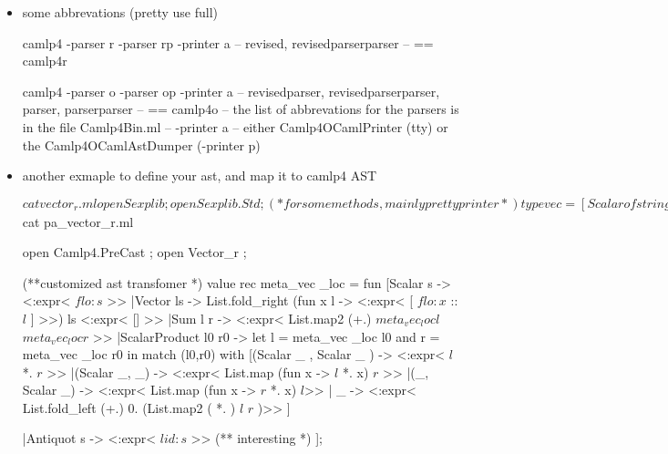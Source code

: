 \begin{itemize}
\begin{ocamlcode}
open Camlp4.PreCast ;;
module Gram = MakeGram(Lexer );;
\end{ocamlcode}


\item some abbrevations (pretty use full)


\begin{ocamlcode}
camlp4 -parser r -parser rp -printer a
--  revised, revisedparserparser
-- == camlp4r

camlp4 -parser o -parser op -printer a
-- revisedparser, revisedparserparser, parser, parserparser
-- == camlp4o
-- the list of abbrevations for the parsers is in the file Camlp4Bin.ml
-- -printer a
-- either Camlp4OCamlPrinter (tty) or the Camlp4OCamlAstDumper (-printer p)

\end{ocamlcode}


\item another exmaple to define your ast, and map it to camlp4 AST   


\begin{ocamlcode}
$cat vector_r.ml
open Sexplib ; 
open Sexplib.Std ;  (* for some methods, mainly pretty printer  *)
type vec = 
  [Scalar of string 
  |Vector of  list string 
  |Sum of vec and vec 
  |ScalarProduct of vec and vec 
  |Antiquot of string ] 
with sexp ;

value (|>) x f = f x ;

value vec_to_string  vec = 
    vec |> sexp_of_vec |> Sexp.to_string ;


$cat pa_vector_r.ml

open Camlp4.PreCast ; 
open Vector_r ;

(**customized ast transfomer *)
value rec meta_vec _loc = fun 
  [Scalar s -> <:expr< $flo:s$ >>
  |Vector ls -> List.fold_right 
    (fun x l -> <:expr< [ $flo:x$ :: $l$ ] >>)
    ls <:expr< [] >> 
  |Sum l r -> <:expr< List.map2 (+.)  $meta_vec _loc l$   $meta_vec _loc r$ >> 
  |ScalarProduct l0 r0 -> 
    let l = meta_vec _loc l0 
    and r = meta_vec _loc r0 
    in match (l0,r0) with 
    [(Scalar _ , Scalar _ ) ->  <:expr< $l$ *. $r$ >>
    |(Scalar _,  _) -> 
      <:expr< List.map (fun x -> $l$ *. x) $r$ >>
    |(_, Scalar _) -> 
      <:expr< List.map (fun x -> $r$ *. x) $l$>>
    | _ -> 
      <:expr< List.fold_left (+.) 0. (List.map2 ( *. ) $l$ $r$ )>>
    ]

   |Antiquot s -> 
     <:expr< $lid:s$ >> (** interesting *)
  ]; 
\end{ocamlcode}




\end{itemize}
